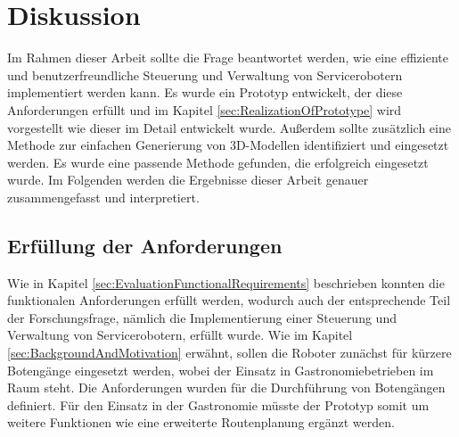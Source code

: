 \newpage
\section{Diskussion}
Im Rahmen dieser Arbeit sollte die Frage beantwortet werden, wie eine effiziente und benutzerfreundliche Steuerung und Verwaltung von Servicerobotern implementiert werden kann. Es wurde ein Prototyp entwickelt, der diese Anforderungen erfüllt und im Kapitel \ref{sec:RealizationOfPrototype} wird vorgestellt wie dieser im Detail entwickelt wurde. Außerdem sollte zusätzlich eine Methode zur einfachen Generierung von 3D-Modellen identifiziert und eingesetzt werden. Es wurde eine passende Methode gefunden, die erfolgreich eingesetzt wurde. Im Folgenden werden die Ergebnisse dieser Arbeit genauer zusammengefasst und interpretiert.

\subsection{Erfüllung der Anforderungen}
Wie in Kapitel \ref{sec:EvaluationFunctionalRequirements} beschrieben konnten die funktionalen Anforderungen erfüllt werden, wodurch auch der entsprechende Teil der Forschungsfrage, nämlich die Implementierung einer Steuerung und Verwaltung von Servicerobotern, erfüllt wurde. Wie im Kapitel \ref{sec:BackgroundAndMotivation} erwähnt, sollen die Roboter zunächst für kürzere Botengänge eingesetzt werden, wobei der Einsatz in Gastronomiebetrieben im Raum steht. Die Anforderungen wurden für die Durchführung von Botengängen definiert. Für den Einsatz in der Gastronomie müsste der Prototyp somit um weitere Funktionen wie eine erweiterte Routenplanung ergänzt werden.

